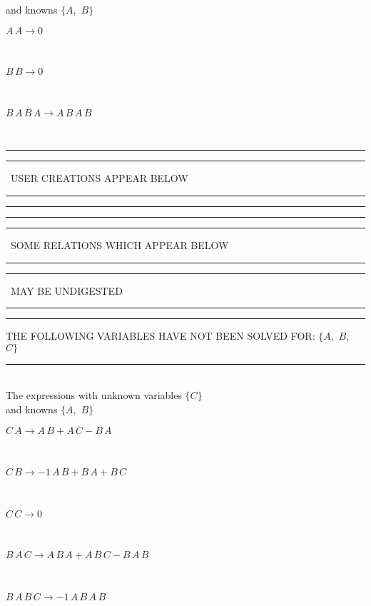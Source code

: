 and knowns $\{A,
$ $
B\}$\smallskip\\
\begin{minipage}{6in}
$
A\,
 A\rightarrow 0
$
\end{minipage}\medskip \\
\begin{minipage}{6in}
$
B\,
 B\rightarrow 0
$
\end{minipage}\medskip \\
\begin{minipage}{6in}
$
B\,
 A\,
 B\,
 A\rightarrow A\,
 B\,
 A\,
 B
$
\end{minipage}\\
\rule[2pt]{6in}{1pt}\hfil\break
\rule[2.5pt]{1.701in}{1pt}
\ USER CREATIONS APPEAR BELOW\ 
\rule[2.5pt]{1.701in}{1pt}\hfil\break
\rule[2pt]{6in}{1pt}\hfil\break
\rule[2pt]{6in}{4pt}\hfil\break
\rule[2pt]{1.45in}{4pt}
\ SOME RELATIONS WHICH APPEAR BELOW\ 
\rule[2pt]{1.45in}{4pt}\hfil\break
\rule[2pt]{2.18in}{4pt}
\ MAY BE UNDIGESTED\ 
\rule[2pt]{2.18in}{4pt}\hfil\break
\rule[2pt]{6in}{4pt}\hfil\break
THE FOLLOWING VARIABLES HAVE NOT BEEN SOLVED FOR:\hfil\break
$\{A,
$ $
B,
$ $
C\}$
\smallskip\\
\rule[3pt]{6in}{.7pt}\\
The expressions with unknown variables $\{C\}$\\
and knowns $\{A,
$ $
B\}$\smallskip\\
\begin{minipage}{6in}
$
C\,
 A\rightarrow A\,
 B + A\,
 C - B\,
 A
$
\end{minipage}\medskip \\
\begin{minipage}{6in}
$
C\,
 B\rightarrow -1\,
 A\,
 B + B\,
 A + B\,
 C
$
\end{minipage}\medskip \\
\begin{minipage}{6in}
$
C\,
 C\rightarrow 0
$
\end{minipage}\medskip \\
\begin{minipage}{6in}
$
B\,
 A\,
 C\rightarrow A\,
 B\,
 A + A\,
 B\,
 C - B\,
 A\,
 B
$
\end{minipage}\medskip \\
\begin{minipage}{6in}
$
B\,
 A\,
 B\,
 C\rightarrow -1\,
 A\,
 B\,
 A\,
 B
$
\end{minipage}\\
\vspace{10pt}


